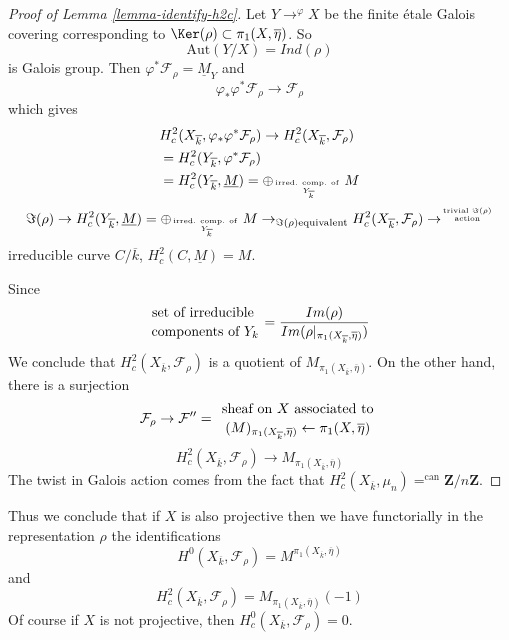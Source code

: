 \begin{proof}[Proof of Lemma \ref{lemma-identify-h2c}]
Let $Y\to^{\varphi}X$ be the finite \'etale Galois covering
corresponding to $\Ker(\rho) \subset \pi_1(X, \overline\eta)$. So
$$
\text{Aut}(Y/X)=Ind(\rho)
$$
is Galois group. Then $\varphi^*\mathcal{F}_\rho =\underline M_Y$ and
$$
\varphi_*\varphi^*\mathcal{F}_\rho\to \mathcal{F}_\rho
$$
which gives
\begin{align*}
& H_c^2(X_{\overline{k}}, \varphi_*\varphi^*\mathcal{F}_\rho) \to
H_c^2(X_{\overline{k}}, \mathcal{F}_\rho)\\
& =H_c^2(Y_{\overline{k}}, \varphi^*\mathcal{F}_\rho)\\
& =H_c^2(Y_{\overline{k}}, \underline M) = \oplus_{\text{irred.
comp. of } \atop Y_{\overline{k}}}M
\end{align*}
$$
\Im(\rho) \to H_c^2(Y_{\overline{k}}, \underline M) =
\oplus_{\text{irred. comp. of } \atop Y_{\overline{k}}}
M \to_{\Im(\rho) \text{equivalent}} H_c^2(X_{\overline{k}},
\mathcal{F}_{\rho}) \to^{\text{trivial }
\Im(\rho) \atop \text{action}}
$$
irreducible curve $C/\overline{k}$, $H_c^2(C, \underline M)=M$.

\medskip\noindent
Since
$$
{\text{set of irreducible } \atop \text{components of }Y_k} =
\frac{Im(\rho)}{Im(\rho|_{\pi_1(X_{\overline{k}}, \overline \eta)})}
$$
We conclude that $H_c^2(X_{\overline{k}}, \mathcal{F}_\rho)$ is a
quotient of $M_{\pi_1(X_{\overline{k}}, \overline \eta)}$. On the other hand,
there is a surjection
$$
\mathcal{F}_\rho\to \mathcal{F}'' = {\text{ sheaf on }
X\text{ associated to } \atop (M)_{\pi_1(X_{\overline{k}}, \overline
\eta)}\leftarrow\pi_1(X, \overline \eta)}
$$
$$
H_c^2(X_{\overline{k}}, \mathcal{F}_\rho)\to
M_{\pi_1(X_{\overline{k}}, \overline\eta)}
$$
The twist in Galois action comes from the fact that
$H_c^2(X_{\overline{k}}, \mu_n)=^{\text{can}} \mathbf{Z}/n\mathbf{Z}$.
\end{proof}

\begin{remark}
\label{remark-projective}
Thus we conclude that if $X$ is also projective then
we have functorially in the representation $\rho$
the identifications
$$
H^0(X_{\overline{k}}, \mathcal{F}_\rho) =
M^{\pi_1(X_{\overline{k}}, \overline\eta)}
$$
and
$$
H_c^2(X_{\overline{k}}, \mathcal{F}_\rho) =
M_{\pi_1(X_{\overline{k}}, \overline \eta)}(-1)
$$
Of course if $X$ is not projective, then
$H^0_c(X_{\overline{k}}, \mathcal{F}_\rho) = 0$.
\end{remark}


